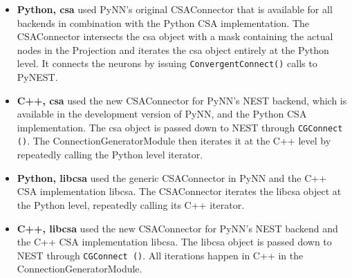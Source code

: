 \documentclass{frontiersSCNS} %
\begin{document}
\begin{itemize}
\item \textbf{Python, csa} used PyNN's original CSAConnector that is
  available for all backends in combination with the Python CSA
  implementation. The CSAConnector intersects the csa object with a
  mask containing the actual nodes in the Projection and iterates the
  csa object entirely at the Python level. It connects the neurons by
  issuing \verb|ConvergentConnect()| calls to PyNEST.
\item \textbf{C++, csa} used the new CSAConnector for PyNN's NEST
  backend, which is available in the development version of PyNN, and the
  Python CSA implementation. The csa object is passed down to NEST
  through \verb|CGConnect ()|. The ConnectionGeneratorModule then
  iterates it at the C++ level by repeatedly calling the Python level
  iterator.
\item \textbf{Python, libcsa} used the generic CSAConnector in PyNN
  and the C++ CSA implementation libcsa. The CSAConnector iterates the
  libcsa object at the Python level, repeatedly calling its C++
  iterator.
\item \textbf{C++, libcsa} used the new CSAConnector for PyNN's NEST
  backend and the C++ CSA implementation libcsa. The libcsa object is
  passed down to NEST through \verb|CGConnect ()|. All iterations
  happen in C++ in the ConnectionGeneratorModule.
\end{itemize}
\end{document}
